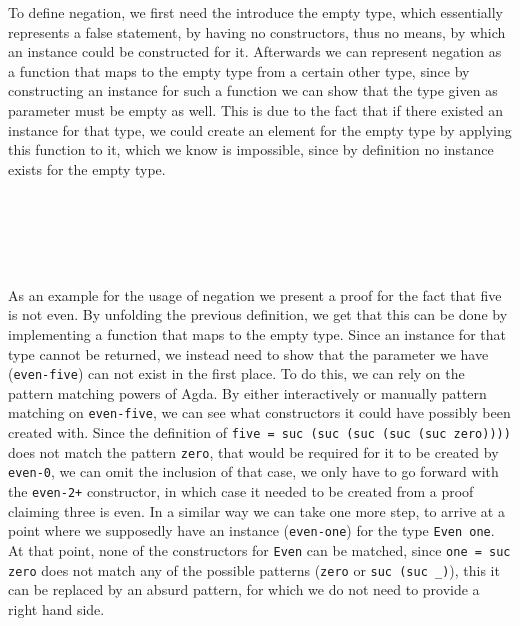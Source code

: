 To define negation, we first need the introduce the empty type, which essentially represents a false statement, by having no constructors, thus no means, by which an instance could be constructed for it. Afterwards we can represent negation as a function that maps to the empty type from a certain other type, since by constructing an instance for such a function we can show that the type given as parameter must be empty as well. This is due to the fact that if there existed an instance for that type, we could create an element for the empty type by applying this function to it, which we know is impossible, since by definition no instance exists for the empty type.

\begin{code}
    \>[0]\AgdaSpace{}%
    \AgdaSpace{}%
    \AgdaSymbol{:}\AgdaSpace{}%
    \AgdaSpace{}%
    \<%
    \\
    \>[0]\<%
    \\
    \\[\AgdaEmptyExtraSkip]%
    \>[0]\AgdaSpace{}%
    \AgdaSymbol{:}\AgdaSpace{}%
    \AgdaSpace{}%
    \AgdaSpace{}%
    \<%
    \\
    \>[0]\AgdaSpace{}%
    \AgdaSpace{}%
    \AgdaSymbol{=}\AgdaSpace{}%
    \AgdaSpace{}%
    \AgdaSpace{}%
    \<%
\end{code}

As an example for the usage of negation we present a proof for the fact that five is not even. By unfolding the previous definition, we get that this can be done by implementing a function that maps to the empty type. Since an instance for that type cannot be returned, we instead need to show that the parameter we have (\verb|even-five|) can not exist in the first place. To do this, we can rely on the pattern matching powers of Agda. By either interactively or manually pattern matching on \verb|even-five|, we can see what constructors it could have possibly been created with. Since the definition of \verb|five = suc (suc (suc (suc (suc zero))))| does not match the pattern \verb|zero|, that would be required for it to be created by \verb|even-0|, we can omit the inclusion of that case, we only have to go forward with the \verb|even-2+| constructor, in which case it needed to be created from a proof claiming three is even. In a similar way we can take one more step, to arrive at a point where we supposedly have an instance (\verb|even-one|) for the type \verb|Even one|. At that point, none of the constructors for \verb|Even| can be matched, since \verb|one = suc zero| does not match any of the possible patterns (\verb|zero| or \verb|suc (suc _)|), this it can be replaced by an absurd pattern, for which we do not need to provide a right hand side.

